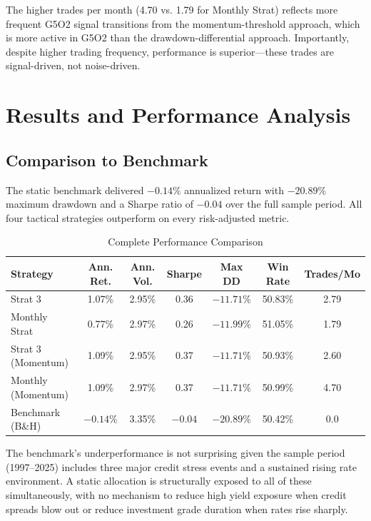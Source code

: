 \documentclass[11pt]{article}
\begin{document}
The higher trades per month (4.70 vs. 1.79 for Monthly Strat) reflects more frequent G5O2 signal transitions from the momentum-threshold approach, which is more active in G5O2 than the drawdown-differential approach. Importantly, despite higher trading frequency, performance is superior---these trades are signal-driven, not noise-driven.

\section{Results and Performance Analysis}

\subsection{Comparison to Benchmark}

The static benchmark delivered $-0.14\%$ annualized return with $-20.89\%$ maximum drawdown and a Sharpe ratio of $-0.04$ over the full sample period. All four tactical strategies outperform on every risk-adjusted metric.

\begin{table}[H]
\centering
\caption{Complete Performance Comparison}
\label{tab:full_comparison}
\begin{tabular}{lcccccc}
\toprule
\textbf{Strategy} & \textbf{Ann. Ret.} & \textbf{Ann. Vol.} & \textbf{Sharpe} & \textbf{Max DD} & \textbf{Win Rate} & \textbf{Trades/Mo} \\
\midrule
Strat 3 & 1.07\% & 2.95\% & 0.36 & $-11.71\%$ & 50.83\% & 2.79 \\
Monthly Strat & 0.77\% & 2.97\% & 0.26 & $-11.99\%$ & 51.05\% & 1.79 \\
Strat 3 (Momentum) & 1.09\% & 2.95\% & 0.37 & $-11.71\%$ & 50.93\% & 2.60 \\
Monthly (Momentum) & 1.09\% & 2.97\% & 0.37 & $-11.71\%$ & 50.99\% & 4.70 \\
\midrule
Benchmark (B\&H) & $-0.14\%$ & 3.35\% & $-0.04$ & $-20.89\%$ & 50.42\% & 0.0 \\
\bottomrule
\end{tabular}
\end{table}

The benchmark's underperformance is not surprising given the sample period (1997--2025) includes three major credit stress events and a sustained rising rate environment. A static allocation is structurally exposed to all of these simultaneously, with no mechanism to reduce high yield exposure when credit spreads blow out or reduce investment grade duration when rates rise sharply.
\end{document}
